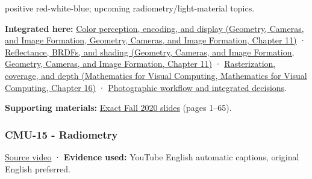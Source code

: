 positive red-white-blue; upcoming radiometry/light-material topics.

\textbf{Integrated here:} \href{../03-Geometry-Cameras-and-Image-Formation/main.pdf\#nameddest=03-visual-computing-i-ch004-color-perception-encoding-and-display}{Color perception, encoding, and display (Geometry, Cameras, and Image Formation, Geometry, Cameras, and Image Formation, Chapter 11)} · \href{../03-Geometry-Cameras-and-Image-Formation/main.pdf\#nameddest=03-visual-computing-i-ch004-reflectance-brdfs-and-shading}{Reflectance, BRDFs, and shading (Geometry, Cameras, and Image Formation, Geometry, Cameras, and Image Formation, Chapter 11)} · \href{../02-Mathematics-for-Visual-Computing/main.pdf\#nameddest=03-visual-computing-i-ch012-rasterization-coverage-and-depth}{Rasterization, coverage, and depth (Mathematics for Visual Computing, Mathematics for Visual Computing, Chapter 16)} · \hyperref[04-visual-computing-ii-ch034-photographic-workflow-and-integrated-decisions]{Photographic workflow and integrated decisions}.

\textbf{Supporting materials:} \href{https://15462.courses.cs.cmu.edu/fall2020content/lectures/14_color/14_color_slides.pdf}{Exact Fall 2020 slides} (pages 1--65).

\subsubsection{CMU-15 - Radiometry}\label{04-visual-computing-ii-ch036-cmu-15---radiometry}

\href{https://www.youtube.com/watch?v=5lGYm8L_rfo}{Source video} · \textbf{Evidence used:} YouTube English automatic captions, original English preferred.

